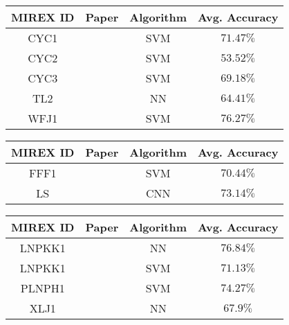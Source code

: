 
\begin{center}

  \begin{tabularx}{\textwidth}{c|X|c|c}

    \textbf{MIREX ID} & \textbf{Paper} & \textbf{Algorithm} & \textbf{Avg. Accuracy} \\
    \hline

    CYC1 & \citet{cyc_2015} & SVM & $71.47\%$ \\
    CYC2 & \citet{cyc_2015} & SVM & $53.52\%$ \\
    CYC3 & \citet{cyc_2015} & SVM & $69.18\%$ \\
    TL2 & \citet{tl_2015} & NN & $64.41\%$ \\
    WFJ1 & \citet{wfj_2015} & SVM & $76.27\%$ \\

  \end{tabularx}

  \label{tab:mirex2015}

\end{center}


\begin{center}

  \begin{tabularx}{\textwidth}{c|X|c|c}

    \textbf{MIREX ID} & \textbf{Paper} & \textbf{Algorithm} & \textbf{Avg. Accuracy} \\
    \hline

    FFF1 & \citet{fff_2016} & SVM & $70.44\%$ \\
    LS & \citet{ls_2016} & CNN & $73.14\%$ \\

  \end{tabularx}

  \label{tab:mirex2016}

\end{center}


\begin{center}

  \begin{tabularx}{\textwidth}{c|X|c|c}

    \textbf{MIREX ID} & \textbf{Paper} & \textbf{Algorithm} & \textbf{Avg. Accuracy} \\
    \hline

    LNPKK1 & \citet{lnpkk_2017} & NN & $76.84\%$ \\
    LNPKK1 & \citet{lnpkk_2017} & SVM & $71.13\%$ \\
    PLNPH1 & \citet{plnph_2017} & SVM & $74.27\%$ \\
    XLJ1 & \citet{xlj_2017} & NN & $67.9\%$ \\

  \end{tabularx}

  \label{tab:mirex2017}

\end{center}
